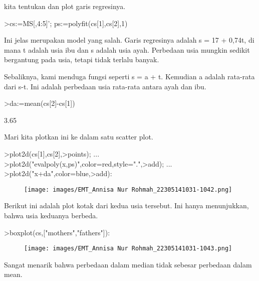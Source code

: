 \documentclass[a4paper,10pt]{article}
\begin{document}
\begin{eulernotebook}
\begin{eulercomment}
\begin{eulercomment}
\begin{eulercomment}
\begin{eulercomment}
\begin{eulercomment}
kita tentukan dan plot garis regresinya.
\end{eulercomment}
\begin{eulerprompt}
>cs:=MS[,4:5]'; ps:=polyfit(cs[1],cs[2],1)
\end{eulerprompt}
\begin{euleroutput}
  [17.3789,  0.740964]
\end{euleroutput}
\begin{eulercomment}
Ini jelas merupakan model yang salah. Garis regresinya adalah s = 17 +
0,74t, di mana t adalah usia ibu dan s adalah usia ayah. Perbedaan
usia mungkin sedikit bergantung pada usia, tetapi tidak terlalu
banyak.

Sebaliknya, kami menduga fungsi seperti s = a + t. Kemudian a adalah
rata-rata dari s-t. Ini adalah perbedaan usia rata-rata antara ayah
dan ibu.
\end{eulercomment}
\begin{eulerprompt}
>da:=mean(cs[2]-cs[1])
\end{eulerprompt}
\begin{euleroutput}
  3.65
\end{euleroutput}
\begin{eulercomment}
Mari kita plotkan ini ke dalam satu scatter plot.
\end{eulercomment}
\begin{eulerprompt}
>plot2d(cs[1],cs[2],>points);  ...
>plot2d("evalpoly(x,ps)",color=red,style=".",>add);  ...
>plot2d("x+da",color=blue,>add):
\end{eulerprompt}
\begin{figure}[h]
    \centering
    \texttt{[image: images/EMT\_Annisa Nur Rohmah\_22305141031-1042.png]}
\end{figure}
\begin{eulercomment}
Berikut ini adalah plot kotak dari kedua usia tersebut. Ini hanya
menunjukkan, bahwa usia keduanya berbeda.
\end{eulercomment}
\begin{eulerprompt}
>boxplot(cs,["mothers","fathers"]):
\end{eulerprompt}
\begin{figure}[h]
    \centering
    \texttt{[image: images/EMT\_Annisa Nur Rohmah\_22305141031-1043.png]}
\end{figure}
\begin{eulercomment}
Sangat menarik bahwa perbedaan dalam median tidak sebesar perbedaan
dalam mean.
\end{eulercomment}
\begin{eulerprompt}

\end{eulerprompt}
\end{eulercomment}
\end{eulercomment}
\end{eulercomment}
\end{eulercomment}
\end{eulernotebook}
\end{document}
